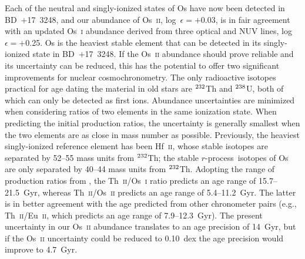 \documentclass{emulateapj}
\newcommand\iso[2]{$^{\rm #1}$#2}
\def\bd{\mbox{BD~$+$17~3248}}
\def\rpro{\mbox{$r$-process}}
\begin{document}
Each of the neutral and singly-ionized states of Os have now been
detected in \bd, and our abundance of Os~\textsc{ii},
log~$\epsilon = +$0.03, 
is in fair agreement with an updated Os~\textsc{i} 
abundance derived from three optical and NUV lines, 
log~$\epsilon = +$0.25.
Os is the heaviest stable element that can be detected in its
singly-ionized state in \bd.
If the Os~\textsc{ii} abundance should prove reliable and its
uncertainty can be reduced, 
this has the potential to offer two significant improvements 
for nuclear cosmochronometry. 
The only radioactive isotopes practical for age dating the material
in old stars are \iso{232}{Th} and \iso{238}{U}, both of which
can only be detected as first ions.
Abundance uncertainties are minimized when considering 
ratios of two elements in the same ionization state.
When predicting the initial production ratios, 
the uncertainty is generally smallest when the two elements
are as close in mass number as possible.
Previously, the heaviest singly-ionized reference 
element has been Hf~\textsc{ii}, whose stable isotopes are
separated by 52--55 mass units from \iso{232}{Th};
the stable \rpro\ isotopes of Os are only separated by 40--44 mass units
from \iso{232}{Th}.
Adopting the range of production ratios from \citet{kratz07},
the Th~\textsc{ii}/Os~\textsc{i} ratio predicts an age range of 
15.7--21.5~Gyr,
whereas Th~\textsc{ii}/Os~\textsc{ii} predicts an age range of 
5.4--11.2~Gyr.
The latter is in better agreement with the age predicted from other
chronometer pairs 
(e.g., Th~\textsc{ii}/Eu~\textsc{ii}, which predicts an age range of 
7.9--12.3~Gyr).
The present uncertainty in our Os~\textsc{ii} abundance translates to an
age precision of 14~Gyr, but if the Os~\textsc{ii} uncertainty 
could be reduced to 0.10~dex 
the age precision would improve to 4.7~Gyr.
\end{document}
